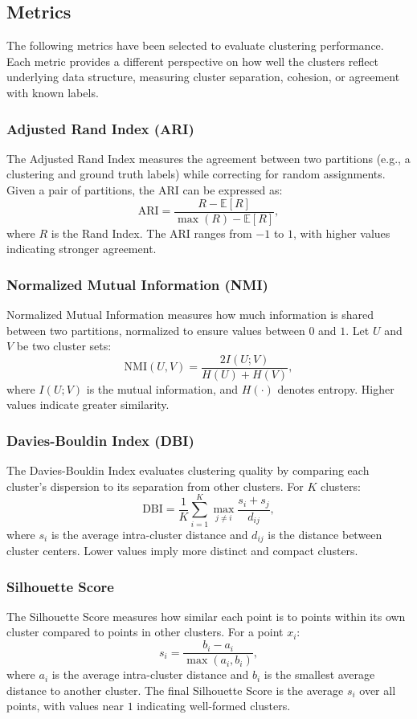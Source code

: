\subsection{Metrics}

The following metrics have been selected to evaluate clustering performance. Each metric provides a different perspective on how well the clusters reflect underlying data structure, measuring cluster separation, cohesion, or agreement with known labels.

\subsubsection{Adjusted Rand Index (ARI)}
The Adjusted Rand Index measures the agreement between two partitions (e.g., a clustering and ground truth labels) while correcting for random assignments. Given a pair of partitions, the ARI can be expressed as:
\[
\text{ARI} = \frac{R - \mathbb{E}[R]}{\max(R) - \mathbb{E}[R]},
\]
where $R$ is the Rand Index. The ARI ranges from $-1$ to $1$, with higher values indicating stronger agreement.

\subsubsection{Normalized Mutual Information (NMI)}
Normalized Mutual Information measures how much information is shared between two partitions, normalized to ensure values between $0$ and $1$. Let $U$ and $V$ be two cluster sets:
\[
\text{NMI}(U, V) = \frac{2 I(U; V)}{H(U) + H(V)},
\]
where $I(U;V)$ is the mutual information, and $H(\cdot)$ denotes entropy. Higher values indicate greater similarity.

\subsubsection{Davies-Bouldin Index (DBI)}
The Davies-Bouldin Index evaluates clustering quality by comparing each cluster’s dispersion to its separation from other clusters. For $K$ clusters:
\[
\text{DBI} = \frac{1}{K} \sum_{i=1}^K \max_{j \neq i} \frac{s_i + s_j}{d_{ij}},
\]
where $s_i$ is the average intra-cluster distance and $d_{ij}$ is the distance between cluster centers. Lower values imply more distinct and compact clusters.

\subsubsection{Silhouette Score}
The Silhouette Score measures how similar each point is to points within its own cluster compared to points in other clusters. For a point $x_i$:
\[
s_i = \frac{b_i - a_i}{\max(a_i, b_i)},
\]
where $a_i$ is the average intra-cluster distance and $b_i$ is the smallest average distance to another cluster. The final Silhouette Score is the average $s_i$ over all points, with values near $1$ indicating well-formed clusters.

